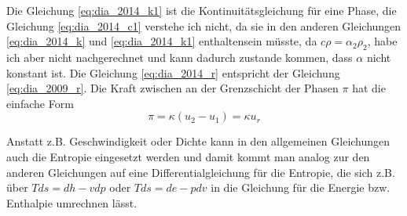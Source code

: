 Die Gleichung \ref{eq:dia_2014_k1} ist die Kontinuitätsgleichung für
eine Phase, die Gleichung \ref{eq:dia_2014_c1} verstehe ich nicht,
da sie in den anderen Gleichungen \ref{eq:dia_2014_k} und
\ref{eq:dia_2014_k1} enthaltensein müsste, da $c\rho =
\alpha_2\rho_2$, habe ich aber nicht nachgerechnet und kann dadurch
zustande kommen, dass $\alpha$ nicht konstant ist. Die Gleichung
\ref{eq:dia_2014_r} entspricht der Gleichung \ref{eq:dia_2009_r}.  Die
Kraft zwischen an der Grenzschicht der Phasen $\pi$ hat die einfache
Form
\[
\pi = \kappa (u_2-u_1) = \kappa u_r
\]

Anstatt z.B. Geschwindigkeit oder Dichte kann in den allgemeinen
Gleichungen auch die Entropie eingesetzt werden und damit kommt man
analog zur den anderen Gleichungen auf eine Differentialgleichung für
die Entropie, die sich z.B. über $Tds = dh - v dp$ oder $T ds = de - p
dv$ in die Gleichung für die Energie bzw. Enthalpie umrechnen lässt.
